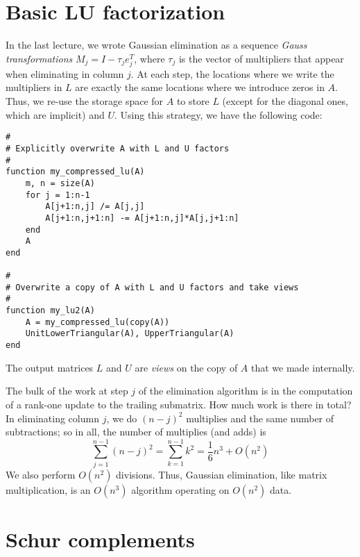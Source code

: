 \documentclass[12pt, leqno]{article}
\begin{document}

\section{Basic LU factorization}

In the last lecture, we wrote Gaussian elimination as a sequence
{\em Gauss transformations} $M_j = I - \tau_j e_j^T$, where $\tau_j$ is
the vector of multipliers that appear when eliminating in column $j$.
At each step, the locations where we
write the multipliers in $L$ are exactly the same locations where we
introduce zeros in $A$.  Thus, we re-use the storage space for $A$
to store $L$ (except for the diagonal ones, which are implicit) and
$U$.  Using this strategy, we have the following code:
\begin{lstlisting}
#
# Explicitly overwrite A with L and U factors
#
function my_compressed_lu(A)
    m, n = size(A)
    for j = 1:n-1
        A[j+1:n,j] /= A[j,j]
        A[j+1:n,j+1:n] -= A[j+1:n,j]*A[j,j+1:n]
    end
    A
end    

#
# Overwrite a copy of A with L and U factors and take views
#
function my_lu2(A)
    A = my_compressed_lu(copy(A))
    UnitLowerTriangular(A), UpperTriangular(A)
end
\end{lstlisting}
The output matrices $L$ and $U$ are {\em views} on the copy of $A$
that we made internally.

The bulk of the work at step $j$ of the elimination algorithm is in
the computation of a rank-one update to the trailing submatrix.
How much work is there in total?  In eliminating column $j$, we do
$(n-j)^2$ multiplies and the same number of subtractions; so in all,
the number of multiplies (and adds) is
\[
  \sum_{j=1}^{n-1} (n-j)^2 = \sum_{k=1}^{n-1} k^2 = \frac{1}{6} n^3 + O(n^2)
\]
We also perform $O(n^2)$ divisions.  Thus, Gaussian elimination, like
matrix multiplication, is an $O(n^3)$ algorithm operating on $O(n^2)$ data.

\section{Schur complements}
\end{document}
